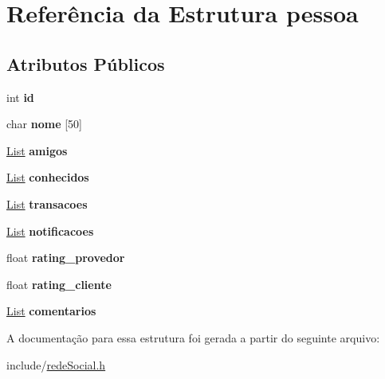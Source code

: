 \hypertarget{structpessoa}{}\section{Referência da Estrutura pessoa}
\label{structpessoa}
\subsection*{Atributos Públicos}
\begin{DoxyCompactItemize}
\item 
\mbox{\label{structpessoa_a8e80bd7d70d7d29b248ef5ec77720b5b}} 
int {\bfseries id}
\item 
\mbox{\label{structpessoa_aab3d539801c72b8740e5467b0cf86839}} 
char {\bfseries nome} \mbox{[}50\mbox{]}
\item 
\mbox{\label{structpessoa_a4eea379bf9c4b63980b2b7b9eb5523cb}} 
\hyperlink{structlistNode}{List} {\bfseries amigos}
\item 
\mbox{\label{structpessoa_a4a0912ceba3d7877996a51dcfd373ce8}} 
\hyperlink{structlistNode}{List} {\bfseries conhecidos}
\item 
\mbox{\label{structpessoa_ad9d343133c3f26aaad1b8e2656235b3d}} 
\hyperlink{structlistNode}{List} {\bfseries transacoes}
\item 
\mbox{\label{structpessoa_a62d9fd43b7e6149b1ad85c7bb1ffa5c4}} 
\hyperlink{structlistNode}{List} {\bfseries notificacoes}
\item 
\mbox{\label{structpessoa_a6aef9f983e1a00eb20e0b4227df8e963}} 
float {\bfseries rating\+\_\+provedor}
\item 
\mbox{\label{structpessoa_afee04df44de2997fa213bbdc1a24a5c0}} 
float {\bfseries rating\+\_\+cliente}
\item 
\mbox{\label{structpessoa_a04fa228b9b6f71210dae022b62fd5fab}} 
\hyperlink{structlistNode}{List} {\bfseries comentarios}
\end{DoxyCompactItemize}


A documentação para essa estrutura foi gerada a partir do seguinte arquivo\+:\begin{DoxyCompactItemize}
\item 
include/\hyperlink{redeSocial_8h}{rede\+Social.\+h}\end{DoxyCompactItemize}
